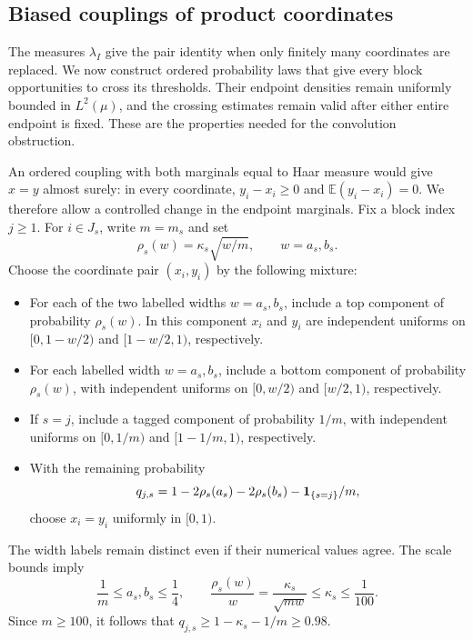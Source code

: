 \subsection{Biased couplings of product coordinates}
\label{p:sec:couplings}

The measures $\lambda_I$ give the pair identity when only finitely many
coordinates are replaced.  We now construct ordered probability laws
that give every block opportunities to cross its thresholds.  Their
endpoint densities remain uniformly bounded in $L^2(\mu)$, and the
crossing estimates remain valid after either entire endpoint is fixed.
These are the properties needed for the convolution obstruction.

An ordered coupling with both marginals equal to Haar measure would
give $x=y$ almost surely: in every coordinate,
$y_i-x_i\ge0$ and $\mathbb E(y_i-x_i)=0$.  We therefore allow a controlled
change in the endpoint marginals.  Fix a block index $j\ge1$.  For
$i\in J_s$, write $m=m_s$ and set
\begin{equation}\label{p:eq:rho-definition}
 \rho_s(w)=\kappa_s\sqrt{w/m},\qquad w=a_s,b_s.
\end{equation}
Choose the coordinate pair $(x_i,y_i)$ by the following mixture:
\begin{itemize}
 \item For each of the two labelled widths $w=a_s,b_s$, include a
 top component of probability $\rho_s(w)$.  In this component $x_i$
 and $y_i$ are independent uniforms on $[0,1-w/2)$ and
 $[1-w/2,1)$, respectively.
 \item For each labelled width $w=a_s,b_s$, include a bottom component
 of probability $\rho_s(w)$, with independent uniforms on $[0,w/2)$
 and $[w/2,1)$, respectively.
 \item If $s=j$, include a tagged component of probability $1/m$,
 with independent uniforms on $[0,1/m)$ and $[1-1/m,1)$,
 respectively.
 \item With the remaining probability
 \begin{equation}\label{p:eq:diagonal-probability}
  q_{j,s}=1-2\rho_s(a_s)-2\rho_s(b_s)
                  -\mathbf 1_{\{s=j\}}/m,
 \end{equation}
 choose $x_i=y_i$ uniformly in $[0,1)$.
\end{itemize}
The width labels remain distinct even if their numerical values agree.
The scale bounds imply
\begin{equation}\label{p:eq:width-bounds}
 \frac1m\le a_s,b_s\le\frac14,
 \qquad
 \frac{\rho_s(w)}{w}=\frac{\kappa_s}{\sqrt{mw}}
       \le\kappa_s\le\frac1{100}.
\end{equation}
Since $m\ge100$, it follows that
$q_{j,s}\ge1-\kappa_s-1/m\ge0.98$.

